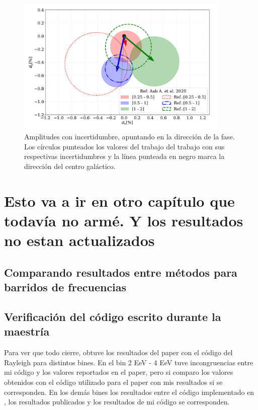 \begin{figure}[H]
    \begin{small}
        \begin{center}
            \includegraphics[width=0.9\textwidth]{comparando_sigmas_v3.pdf}
        \end{center}
        \caption{Amplitudes con incertidumbre, apuntando en la dirección  de la fase. Los círculos punteados los valores del trabajo \cite{Aab_2020}del trabajo \cite{Aab_2020} con sus respectivas incertidumbres y la línea punteada en negro marca la dirección del centro galáctico.}
        \label{fig:incertidumbre}
    \end{small}
\end{figure}


\chapter{Esto va a ir en otro capítulo que todavía no armé. Y los resultados no estan actualizados}
\section{Comparando resultados entre métodos para barridos de frecuencias}

\section{Verificación del código escrito durante la maestría}

Para ver que todo cierre, obtuve los resultados del paper \cite{Aab_2020} con el código del Rayleigh para distintos bines. En el bin  2 EeV - 4 EeV  tuve incongruencias entre mi código y los valores reportados en el paper, pero si comparo los valores obtenidos con el código utilizado para el paper con mis resultados si se corresponden. En los demás bines los resultados entre el código implementado en \cite{Aab_2020}, los resultados publicados y los resultados de mi código se corresponden.


